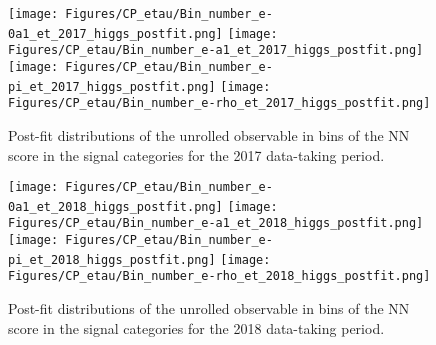 \begin{figure}[H]
    \centering
    \texttt{[image: Figures/CP\_etau/Bin\_number\_e-0a1\_et\_2017\_higgs\_postfit.png]}
    \texttt{[image: Figures/CP\_etau/Bin\_number\_e-a1\_et\_2017\_higgs\_postfit.png]}
    \texttt{[image: Figures/CP\_etau/Bin\_number\_e-pi\_et\_2017\_higgs\_postfit.png]}
    \texttt{[image: Figures/CP\_etau/Bin\_number\_e-rho\_et\_2017\_higgs\_postfit.png]}
    \caption{Post-fit distributions of the unrolled \phicp observable in bins of the NN score in the signal categories for the 2017 data-taking period.}
\end{figure}

\begin{figure}[H]
    \centering
    \texttt{[image: Figures/CP\_etau/Bin\_number\_e-0a1\_et\_2018\_higgs\_postfit.png]}
    \texttt{[image: Figures/CP\_etau/Bin\_number\_e-a1\_et\_2018\_higgs\_postfit.png]}
    \texttt{[image: Figures/CP\_etau/Bin\_number\_e-pi\_et\_2018\_higgs\_postfit.png]}
    \texttt{[image: Figures/CP\_etau/Bin\_number\_e-rho\_et\_2018\_higgs\_postfit.png]}
    \caption{Post-fit distributions of the unrolled \phicp observable in bins of the NN score in the signal categories for the 2018 data-taking period.}
\end{figure}
